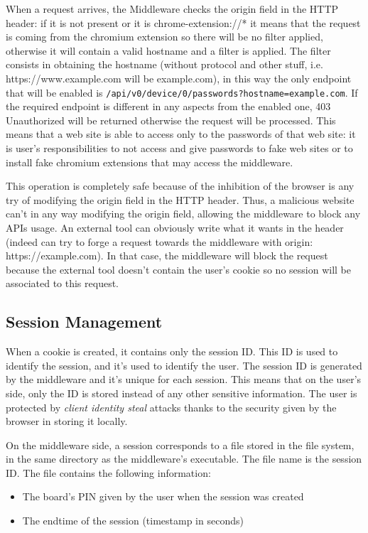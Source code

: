 When a request arrives, the Middleware checks the origin field in the HTTP header: if it is not present or it is chrome-extension://* it means that the request is coming from the chromium extension so there will be no filter applied, otherwise it will contain a valid hostname and a filter is applied. The filter consists in obtaining the hostname (without protocol and other stuff, i.e. https://www.example.com will be example.com), in this way the only endpoint that will be enabled is \texttt{/api/v0/device/0/passwords?hostname=example.com}. If the required endpoint is different in any aspects from the enabled one, 403 Unauthorized will be returned otherwise the request will be processed. This means that a web site is able to access only to the passwords of that web site: it is user's responsibilities to not access and give passwords to fake web sites or to install fake chromium extensions that may access the middleware. \bigskip

This operation is completely safe because of the inhibition of the browser is any try of modifying the origin field in the HTTP header. Thus, a malicious website can't in any way modifying the origin field, allowing the middleware to block any APIs usage. An external tool can obviously write what it wants in the header (indeed can try to forge a request towards the middleware with origin: https://example.com). In that case, the middleware will block the request because the external tool doesn't contain the user's cookie so no session will be associated to this request.

\subsection{Session Management}
When a cookie is created, it contains only the session ID. This ID is used to identify the session, and it's used to identify the user. The session ID is generated by the middleware and it's unique for each session. This means that on the user's side, only the ID is stored instead of any other sensitive information. The user is protected by \textit{client identity steal} attacks thanks to the security given by the browser in storing it locally.

On the middleware side, a session corresponds to a file stored in the file system, in the same directory as the middleware's executable. The file name is the session ID. The file contains the following information:

\begin{itemize}
    \item The board's PIN given by the user when the session was created
    \item The endtime of the session (timestamp in seconds)
\end{itemize}


